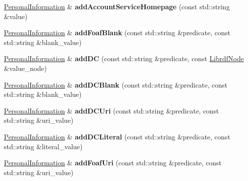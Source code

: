 \begin{DoxyCompactItemize}
\hyperlink{classomexmeta_1_1PersonalInformation}{Personal\+Information} \& {\bfseries add\+Account\+Service\+Homepage} (const std\+::string \&value)
\item 
\mbox{\label{classomexmeta_1_1PersonalInformation_af26bf72dc840b9c45fa7494f7164c04d}} 
\hyperlink{classomexmeta_1_1PersonalInformation}{Personal\+Information} \& {\bfseries add\+Foaf\+Blank} (const std\+::string \&predicate, const std\+::string \&blank\+\_\+value)
\item 
\mbox{\label{classomexmeta_1_1PersonalInformation_a1df32d40f46d98767fc360015bf0f3ed}} 
\hyperlink{classomexmeta_1_1PersonalInformation}{Personal\+Information} \& {\bfseries add\+DC} (const std\+::string \&predicate, const \hyperlink{classredland_1_1LibrdfNode}{Librdf\+Node} \&value\+\_\+node)
\item 
\mbox{\label{classomexmeta_1_1PersonalInformation_a1458c6e092a9436a956ffd6a92c71d16}} 
\hyperlink{classomexmeta_1_1PersonalInformation}{Personal\+Information} \& {\bfseries add\+D\+C\+Blank} (const std\+::string \&predicate, const std\+::string \&blank\+\_\+value)
\item 
\mbox{\label{classomexmeta_1_1PersonalInformation_a1c605320ec0f12dda246cc3abdb0aeae}} 
\hyperlink{classomexmeta_1_1PersonalInformation}{Personal\+Information} \& {\bfseries add\+D\+C\+Uri} (const std\+::string \&predicate, const std\+::string \&uri\+\_\+value)
\item 
\mbox{\label{classomexmeta_1_1PersonalInformation_a843d2eddcdb33fc49d7de5059f5fa04c}} 
\hyperlink{classomexmeta_1_1PersonalInformation}{Personal\+Information} \& {\bfseries add\+D\+C\+Literal} (const std\+::string \&predicate, const std\+::string \&literal\+\_\+value)
\item 
\mbox{\label{classomexmeta_1_1PersonalInformation_a7d760a327fe103386f1bb08063f8795a}} 
\hyperlink{classomexmeta_1_1PersonalInformation}{Personal\+Information} \& {\bfseries add\+Foaf\+Uri} (const std\+::string \&predicate, const std\+::string \&uri\+\_\+value)
\item 
\mbox{\label{classomexmeta_1_1PersonalInformation_ae6fbd4fad2a738fae9fce7affa6b2f15}} 

\end{DoxyCompactItemize}
